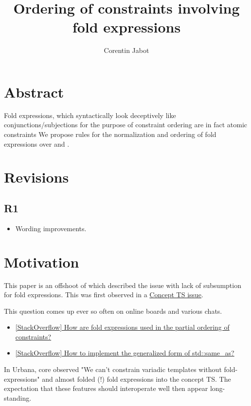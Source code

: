 \documentclass{wg21}
\title{Ordering of constraints involving fold expressions}
\author{Corentin Jabot}{corentin.jabot@gmail.com}
\begin{document}
\maketitle

\section{Abstract}

Fold expressions, which syntactically look deceptively like conjunctions/subjections for the purpose of constraint ordering are in fact atomic constraints
We propose rules for the normalization and ordering of fold expressions over \tcode{\&\&} and \tcode{||}.

\section{Revisions}

\subsection{R1}

\begin{itemize}
\item Wording improvements.
\end{itemize}

\section{Motivation}

This paper is an offshoot of  which described the issue with lack of subsumption for fold expressions.
This was first observed in a \href{http://cplusplus.github.io/concepts-ts/ts-active.html#28}{Concept TS issue}.

This question comes up ever so often on online boards and various chats.

\begin{itemize}
\item \href{https://stackoverflow.com/questions/34843745}{[StackOverflow] How are fold expressions used in the partial ordering of constraints?}
\item \href{https://stackoverflow.com/questions/58724459/}{[StackOverflow] How to implement the generalized form of std::same_as?}
\end{itemize}

In Urbana, core observed "We can't constrain variadic templates without fold-expressions" and almost folded (!) fold expressions into the concept TS.
The expectation that these features should interoperate well then appear long-standing.
\end{document}
